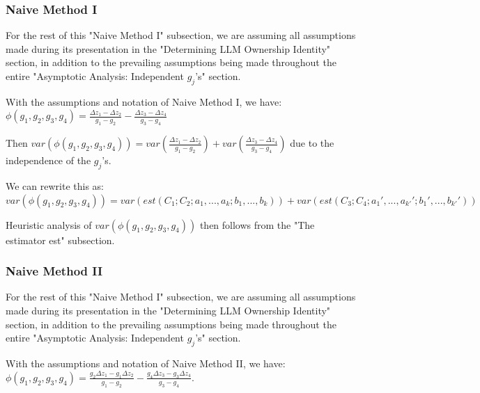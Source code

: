 \documentclass{article}
\begin{document}
\subsubsection{Naive Method I}
\begin{mdframed}
    For the rest of this "Naive Method I" subsection, we are assuming all assumptions made during its presentation in the "Determining LLM Ownership Identity" section, in addition to the prevailing assumptions being made throughout the entire "Asymptotic Analysis: Independent $\displaystyle g_{j}$'s" section.
\end{mdframed}

With the assumptions and notation of Naive Method I, we have: $\displaystyle \phi \left( g_{1} ,g_{2} ,g_{3} ,g_{4}\right) =\frac{\Delta z_{1} -\Delta z_{2}}{g_{1} -g_{2}} -\frac{\Delta z_{3} -\Delta z_{4}}{g_{3} -g_{4}}$

Then $\displaystyle var\left( \phi \left( g_{1} ,g_{2} ,g_{3} ,g_{4}\right)\right) =var\left(\frac{\Delta z_{1} -\Delta z_{2}}{g_{1} -g_{2}}\right) +var\left(\frac{\Delta z_{3} -\Delta z_{4}}{g_{3} -g_{4}}\right)$ due to the independence of the $\displaystyle g_{j}$'s.



We can rewrite this as: $\displaystyle var\left( \phi \left( g_{1} ,g_{2} ,g_{3} ,g_{4}\right)\right) =var\left( est\left( C_{1} ;C_{2} ;a_{1} ,...,a_{k} ;b_{1} ,...,b_{k}\right)\right) +var\left( est\left( C_{3} ;C_{4} ;a_{1} ',...,a_{k'} ';b_{1} ',...,b_{k'} '\right)\right)$



Heuristic analysis of $\displaystyle var\left( \phi \left( g_{1} ,g_{2} ,g_{3} ,g_{4}\right)\right)$ then follows from the "The estimator est" subsection.



\subsubsection{Naive Method II}
\begin{mdframed}
    For the rest of this "Naive Method I" subsection, we are assuming all assumptions made during its presentation in the "Determining LLM Ownership Identity" section, in addition to the prevailing assumptions being made throughout the entire "Asymptotic Analysis: Independent $\displaystyle g_{j}$'s" section.
\end{mdframed}
With the assumptions and notation of Naive Method II, we have: $\displaystyle \phi \left( g_{1} ,g_{2} ,g_{3} ,g_{4}\right) =\frac{g_{2} \Delta z_{1} -g_{1} \Delta z_{2}}{g_{1} -g_{2}} -\frac{g_{4} \Delta z_{3} -g_{3} \Delta z_{4}}{g_{3} -g_{4}}$.
\end{document}
